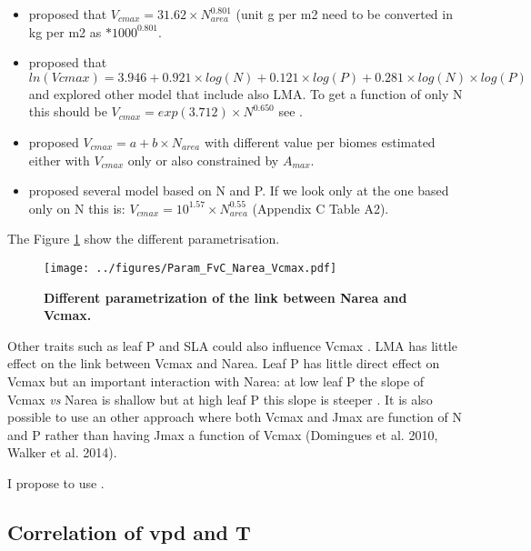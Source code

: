 \documentclass[a4paper,11pt]{article}
\begin{document}
\begin{itemize}

\item \citet{Sakschewski-2015} proposed that $V_{cmax} = 31.62 \times N_{area}^{0.801}$ (unit g per m2 need to be converted in kg per m2 as $*1000^{0.801}$.

\item  \citet{Walker-2014} proposed that $ln(Vcmax) = 3.946 + 0.921 \times log(N) + 0.121 \times log(P) + 0.281 \times log(N) \times log(P)$ and explored other model that include also LMA. To get a function of only N this should be $V_{cmax} = exp(3.712) \times N^{0.650}$ see  \citet{Walker-2017}.

\item \citet{Kattge-2011} proposed $V_{cmax} = a + b \times N_{area}$ with different value per biomes estimated either with $V_{cmax}$ only or also constrained by $A_{max}$.

\item \citet{Domingues-2010} proposed several model based on N and P.  If we look only at the one based only on N this is: $V_{cmax} = 10^{1.57} \times N_{area}^{0.55}$ (Appendix C Table A2).

\end{itemize}

The Figure \ref{fig:Narea_Vcmax} show the different parametrisation.

\begin{figure}[ht]
\centering
\texttt{[image: ../figures/Param\_FvC\_Narea\_Vcmax.pdf]}
\caption{\textbf{Different parametrization of the link between Narea and Vcmax.}
\label{fig:Narea_Vcmax}}
\end{figure}

Other traits such as leaf P and SLA could also influence Vcmax \citep{Walker-2014,Domingues-2010}. LMA has little effect on the link between Vcmax and Narea.  Leaf P has little direct effect on Vcmax but an important interaction with Narea: at low leaf P the slope of Vcmax \textit{vs} Narea is shallow but at high leaf P this slope is steeper \citep{Walker-2014}.
It is also possible to use an other approach where both Vcmax and Jmax
are function of N and P rather than having Jmax a function of Vcmax (Domingues et al. 2010, Walker et al. 2014).

I propose to use \citet{Sakschewski-2015}.

\pagebreak

\subsection{Correlation of vpd and T}
\end{document}
